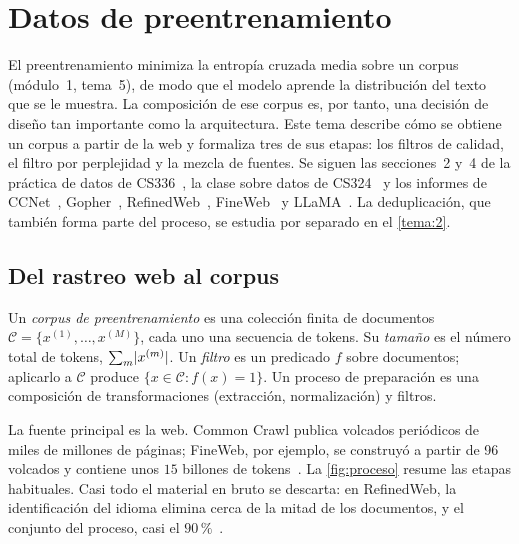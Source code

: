 \chapter{Datos de preentrenamiento}
\label{tema:1}

El preentrenamiento minimiza la entropía cruzada media sobre un corpus (módulo~1, tema~5), de modo que el modelo aprende la distribución del texto que se le muestra. La composición de ese corpus es, por tanto, una decisión de diseño tan importante como la arquitectura. Este tema describe cómo se obtiene un corpus a partir de la web y formaliza tres de sus etapas: los filtros de calidad, el filtro por perplejidad y la mezcla de fuentes. Se siguen las secciones~2 y~4 de la práctica de datos de CS336~\cite{cs336a4}, la clase sobre datos de CS324~\cite{cs324} y los informes de CCNet~\cite{wenzek}, Gopher~\cite[§3.4 y apéndice~A]{rae}, RefinedWeb~\cite[§3]{refinedweb}, FineWeb~\cite{fineweb} y LLaMA~\cite[§2.1]{llama}. La deduplicación, que también forma parte del proceso, se estudia por separado en el \cref{tema:2}.

\section{Del rastreo web al corpus}

\begin{definicion}
Un \emph{corpus de preentrenamiento} es una colección finita de documentos $\mathcal{C}=\{x^{(1)},\dots,x^{(M)}\}$, cada uno una secuencia de tokens. Su \emph{tamaño} es el número total de tokens, $\sum_{m}\lvert x^{(m)}\rvert$. Un \emph{filtro} es un predicado $f$ sobre documentos; aplicarlo a $\mathcal{C}$ produce $\{x\in\mathcal{C}:f(x)=1\}$. Un proceso de preparación es una composición de transformaciones (extracción, normalización) y filtros.
\end{definicion}

La fuente principal es la web. Common Crawl publica volcados periódicos de miles de millones de páginas; FineWeb, por ejemplo, se construyó a partir de 96 volcados y contiene unos $15$ billones de tokens~\cite{fineweb}. La \cref{fig:proceso} resume las etapas habituales. Casi todo el material en bruto se descarta: en RefinedWeb, la identificación del idioma elimina cerca de la mitad de los documentos, y el conjunto del proceso, casi el $90\,\%$~\cite[§3 y figura~2]{refinedweb}.

